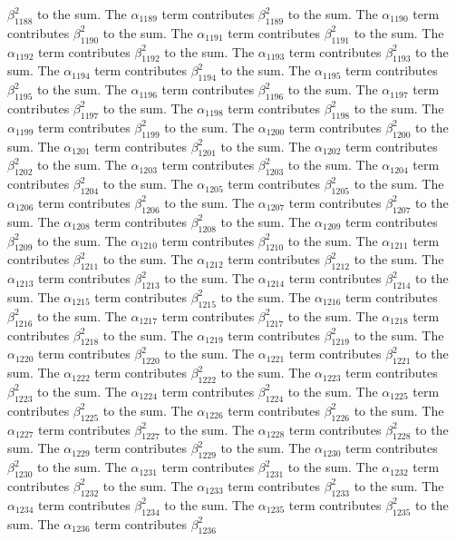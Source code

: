 \begin{lemma}
$\beta_{1188}^{2}$ to the sum. The $\alpha_{1189}$ term contributes $\beta_{1189}^{2}$ to the sum. The $\alpha_{1190}$ term contributes $\beta_{1190}^{2}$ to the sum. The $\alpha_{1191}$ term contributes $\beta_{1191}^{2}$ to the sum. The $\alpha_{1192}$ term contributes $\beta_{1192}^{2}$ to the sum. The $\alpha_{1193}$ term contributes $\beta_{1193}^{2}$ to the sum. The $\alpha_{1194}$ term contributes $\beta_{1194}^{2}$ to the sum. The $\alpha_{1195}$ term contributes $\beta_{1195}^{2}$ to the sum. The $\alpha_{1196}$ term contributes $\beta_{1196}^{2}$ to the sum. The $\alpha_{1197}$ term contributes $\beta_{1197}^{2}$ to the sum. The $\alpha_{1198}$ term contributes $\beta_{1198}^{2}$ to the sum. The $\alpha_{1199}$ term contributes $\beta_{1199}^{2}$ to the sum. The $\alpha_{1200}$ term contributes $\beta_{1200}^{2}$ to the sum. The $\alpha_{1201}$ term contributes $\beta_{1201}^{2}$ to the sum. The $\alpha_{1202}$ term contributes $\beta_{1202}^{2}$ to the sum. The $\alpha_{1203}$ term contributes $\beta_{1203}^{2}$ to the sum. The $\alpha_{1204}$ term contributes $\beta_{1204}^{2}$ to the sum. The $\alpha_{1205}$ term contributes $\beta_{1205}^{2}$ to the sum. The $\alpha_{1206}$ term contributes $\beta_{1206}^{2}$ to the sum. The $\alpha_{1207}$ term contributes $\beta_{1207}^{2}$ to the sum. The $\alpha_{1208}$ term contributes $\beta_{1208}^{2}$ to the sum. The $\alpha_{1209}$ term contributes $\beta_{1209}^{2}$ to the sum. The $\alpha_{1210}$ term contributes $\beta_{1210}^{2}$ to the sum. The $\alpha_{1211}$ term contributes $\beta_{1211}^{2}$ to the sum. The $\alpha_{1212}$ term contributes $\beta_{1212}^{2}$ to the sum. The $\alpha_{1213}$ term contributes $\beta_{1213}^{2}$ to the sum. The $\alpha_{1214}$ term contributes $\beta_{1214}^{2}$ to the sum. The $\alpha_{1215}$ term contributes $\beta_{1215}^{2}$ to the sum. The $\alpha_{1216}$ term contributes $\beta_{1216}^{2}$ to the sum. The $\alpha_{1217}$ term contributes $\beta_{1217}^{2}$ to the sum. The $\alpha_{1218}$ term contributes $\beta_{1218}^{2}$ to the sum. The $\alpha_{1219}$ term contributes $\beta_{1219}^{2}$ to the sum. The $\alpha_{1220}$ term contributes $\beta_{1220}^{2}$ to the sum. The $\alpha_{1221}$ term contributes $\beta_{1221}^{2}$ to the sum. The $\alpha_{1222}$ term contributes $\beta_{1222}^{2}$ to the sum. The $\alpha_{1223}$ term contributes $\beta_{1223}^{2}$ to the sum. The $\alpha_{1224}$ term contributes $\beta_{1224}^{2}$ to the sum. The $\alpha_{1225}$ term contributes $\beta_{1225}^{2}$ to the sum. The $\alpha_{1226}$ term contributes $\beta_{1226}^{2}$ to the sum. The $\alpha_{1227}$ term contributes $\beta_{1227}^{2}$ to the sum. The $\alpha_{1228}$ term contributes $\beta_{1228}^{2}$ to the sum. The $\alpha_{1229}$ term contributes $\beta_{1229}^{2}$ to the sum. The $\alpha_{1230}$ term contributes $\beta_{1230}^{2}$ to the sum. The $\alpha_{1231}$ term contributes $\beta_{1231}^{2}$ to the sum. The $\alpha_{1232}$ term contributes $\beta_{1232}^{2}$ to the sum. The $\alpha_{1233}$ term contributes $\beta_{1233}^{2}$ to the sum. The $\alpha_{1234}$ term contributes $\beta_{1234}^{2}$ to the sum. The $\alpha_{1235}$ term contributes $\beta_{1235}^{2}$ to the sum. The $\alpha_{1236}$ term contributes $\beta_{1236}^{2}$ 
\end{lemma}

